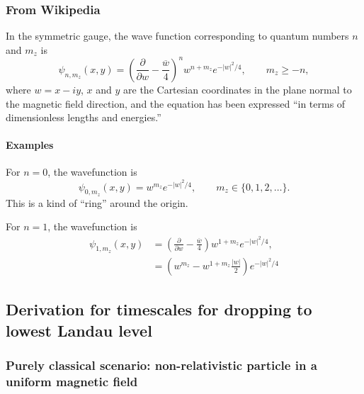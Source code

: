 \documentclass{book}
\newcommand{\pd}[2]{\frac{\partial {#1}}{\partial {#2}}}
\begin{document}
\subsubsection{From Wikipedia}

In the symmetric gauge, the wave function corresponding to quantum numbers $n$ and $m_z$ is
\begin{equation}
    \psi_{n,m_z}(x,y) = \left(\pd{}{w} - \frac{\overline{w}}{4}\right)^n w^{n + m_z} e^{-|w|^2/4}, \qquad m_z \ge -n,
\end{equation}
where $w = x - iy$, $x$ and $y$ are the Cartesian coordinates in the plane normal to the magnetic field direction, and the equation has been expressed ``in terms of dimensionless lengths and energies.''

\paragraph{Examples}

For $n = 0$, the wavefunction is
\begin{equation}
    \psi_{0,m_z}(x,y) = w^{m_z} e^{-|w|^2/4}, \qquad m_z \in \{0, 1, 2, \dots\}.
\end{equation}
This is a kind of ``ring'' around the origin.

For $n = 1$, the wavefunction is
\begin{equation}
    \begin{aligned}
        \psi_{1,m_z}(x,y)
            &= \left(\pd{}{w} - \frac{\overline{w}}{4}\right) w^{1 + m_z} e^{-|w|^2/4}, \\
            &= \left(w^{m_z} - w^{1 + m_z}\frac{|w|}{2}\right) e^{-|w|^2/4}
    \end{aligned}
\end{equation}

\subsection{Derivation for timescales for dropping to lowest Landau level}

\subsubsection{Purely classical scenario: non-relativistic particle in a uniform magnetic field}
\end{document}
